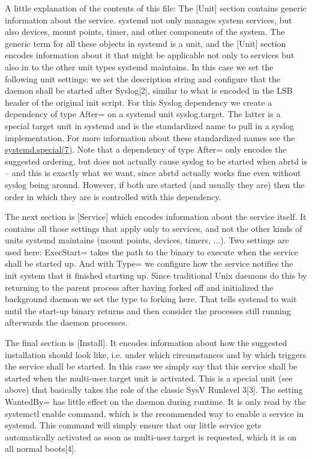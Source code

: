 \documentclass[titlepage]{article}
\begin{document}
A little explanation of the contents of this file: The [Unit] section contains generic information about the service. systemd not only manages system services, but also devices, mount points, timer, and other components of the system. The generic term for all these objects in systemd is a unit, and the [Unit] section encodes information about it that might be applicable not only to services but also in to the other unit types systemd maintains. In this case we set the following unit settings: we set the description string and configure that the daemon shall be started after Syslog[2], similar to what is encoded in the LSB header of the original init script. For this Syslog dependency we create a dependency of type After= on a systemd unit syslog.target. The latter is a special target unit in systemd and is the standardized name to pull in a syslog implementation. For more information about these standardized names see the \href{https://0pointer.de/public/systemd-man/systemd.special.html}{systemd.special(7)}. Note that a dependency of type After= only encodes the suggested ordering, but does not actually cause syslog to be started when abrtd is -- and this is exactly what we want, since abrtd actually works fine even without syslog being around. However, if both are started (and usually they are) then the order in which they are is controlled with this dependency.

The next section is [Service] which encodes information about the service itself. It contains all those settings that apply only to services, and not the other kinds of units systemd maintains (mount points, devices, timers, ...). Two settings are used here: ExecStart= takes the path to the binary to execute when the service shall be started up. And with Type= we configure how the service notifies the init system that it finished starting up. Since traditional Unix daemons do this by returning to the parent process after having forked off and initialized the background daemon we set the type to forking here. That tells systemd to wait until the start-up binary returns and then consider the processes still running afterwards the daemon processes.

The final section is [Install]. It encodes information about how the suggested installation should look like, i.e. under which circumstances and by which triggers the service shall be started. In this case we simply say that this service shall be started when the multi-user.target unit is activated. This is a special unit (see above) that basically takes the role of the classic SysV Runlevel 3[3]. The setting WantedBy= has little effect on the daemon during runtime. It is only read by the systemctl enable command, which is the recommended way to enable a service in systemd. This command will simply ensure that our little service gets automatically activated as soon as multi-user.target is requested, which it is on all normal boots[4].
\end{document}
